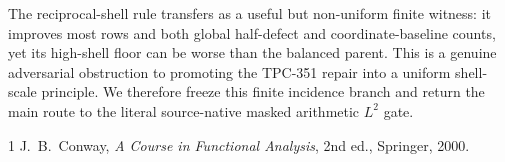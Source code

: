 \documentclass[10pt]{article}
\begin{document}
The reciprocal-shell rule transfers as a useful but non-uniform finite witness:
it improves most rows and both global half-defect and coordinate-baseline
counts, yet its high-shell floor can be worse than the balanced parent.  This
is a genuine adversarial obstruction to promoting the TPC-351 repair into a
uniform shell-scale principle.  We therefore freeze this finite incidence
branch and return the main route to the literal source-native masked
arithmetic $L^2$ gate.

\begin{thebibliography}{1}
J.~B.~Conway, \emph{A Course in Functional Analysis}, 2nd ed., Springer, 2000.
\end{thebibliography}
\end{document}
